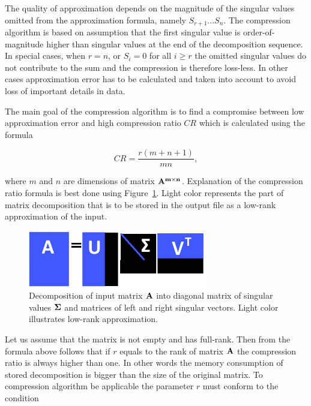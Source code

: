 The quality of approximation depends on the magnitude of the singular values omitted from the approximation formula, namely $S_{r+1} ...  S_{n}$. The compression algorithm is based on assumption that the first singular value is order-of-magnitude higher than singular values at the end of the decomposition sequence. In special cases, when $r=n$, or $S_{i}=0$ for all $i \geq r$ the omitted singular values do not contribute to the sum and the compression is therefore loss-less. In other cases approximation error has to be calculated and taken into account to avoid loss of important details in data.

The main goal of the compression algorithm is to find a compromise between low approximation error and high compression ratio $CR$ which is calculated using the formula

\begin{equation}
CR=\frac{r(m+n+1)}{m n},
\label{eq:cr-def}
\end{equation}

where $m$ and $n$ are dimensions of matrix $\mathbf{A^{m \times n}}$. Explanation of the compression ratio formula is best done using Figure~\ref{fig:lowrank_svd}. Light color represents the part of matrix decomposition that is to be stored in the output file as a low-rank approximation of the input.

\begin{figure}[ht]
\centering\includegraphics[width=0.7\textwidth]{figures/low_rank_decomposition_diagram}
\caption{Decomposition of input matrix $\mathbf{A}$ into diagonal matrix of singular values $\mathbf{\Sigma}$ and matrices of left and right singular vectors. Light color illustrates low-rank approximation.}
\label{fig:lowrank_svd}
\end{figure}

Let us assume that the matrix is not empty and has full-rank. Then from the formula above follows that if $r$ equals to the rank of matrix $\mathbf{A}$ the compression ratio is always higher than one. In other words the memory consumption of stored decomposition is bigger than the size of the original matrix. To compression algorithm be applicable the parameter $r$ must conform to the condition

